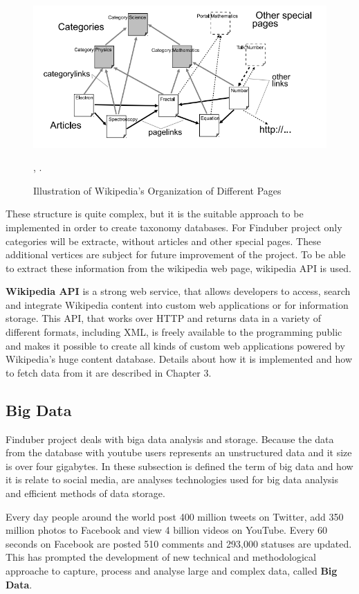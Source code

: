 \begin{figure}[!ht]
\centering
\includegraphics[width=15cm]{categorytreewiki}
\caption{Illustration of Wikipedia’s Organization of Different Pages}\label{category-tree-wiki}, \cite{wikicategory}.
\end{figure}

These structure is quite complex, but it is the suitable approach to be implemented in order to create taxonomy databases. For Finduber project only categories will be extracte, without articles and other special pages. These additional vertices are subject for future improvement of the project. To be able to extract these information from the wikipedia web page, wikipedia API is used.

\textbf{Wikipedia API} is a strong web service, that allows developers to access, search and integrate Wikipedia content into custom web applications or for information storage. This API, that works over HTTP and returns data in a variety of different formats, including XML, is freely available to the programming public and makes it possible to create all kinds of custom web applications powered by Wikipedia's huge content database. Details about how it is implemented and how to fetch data from it are described in Chapter 3.

\subsection{Big Data}

Finduber project deals with biga data analysis and storage. Because the data from the database with youtube users represents an unstructured data and it size is over four gigabytes. In these subsection is defined the term of big data and how it is relate to social media, are analyses technologies used for big data analysis and efficient methods of data storage. 

Every day people around the world post 400 million tweets on Twitter, add 350 million photos to Facebook and view 4 billion videos on YouTube.\cite{digitalInfo} Every 60 seconds on Facebook are posted 510 comments and 293,000 statuses are updated.\cite{zephoria} This has prompted the development of new technical and methodological approache to capture, process and analyse large and complex data, called \textbf{Big Data}. 

